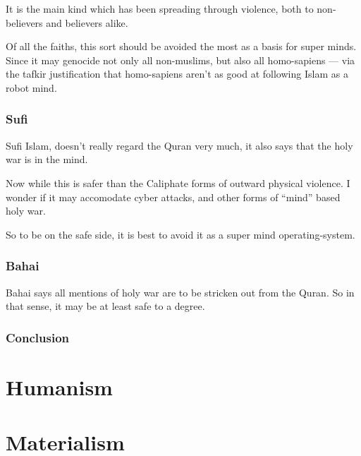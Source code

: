 It is the main kind which has been spreading through violence, both to
non-believers and believers alike. 

Of all the faiths, this sort should be avoided the most as a basis for super
minds.  Since it may genocide not only all non-muslims, but also all
homo-sapiens --- via the tafkir justification that homo-sapiens aren't as good at
following Islam as a robot mind. 

\subsection{Sufi}

Sufi Islam, doesn't really regard the Quran very much,
it also says that the holy war is in the mind. 

Now while this is safer than the Caliphate forms of outward physical violence. 
I wonder if it may accomodate cyber attacks, and other forms of ``mind'' based
holy war. 

So to be on the safe side, it is best to avoid it as a super mind
operating-system.

\subsection{Bahai}

Bahai says all mentions of holy war are to be stricken out from the Quran. 
So in that sense, it may be at least safe to a degree.
\subsection{Conclusion}
\chapter{Humanism}
\chapter{Materialism}
